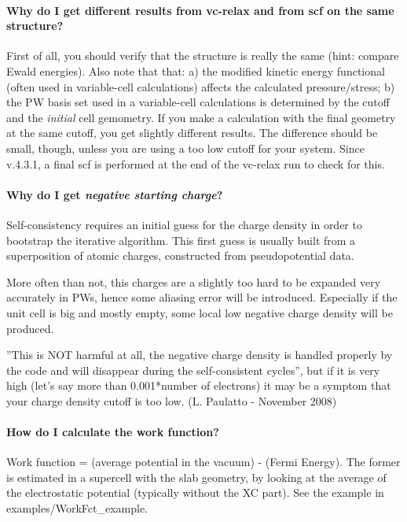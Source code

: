 \documentclass[12pt,a4paper]{article}
\begin{document}
\paragraph{Why do I get different results from vc-relax and from scf 
on the same structure?}
First of all, you should verify that the structure is really the same
(hint: compare Ewald energies). Also note that
that: a) the modified kinetic energy functional (often used in
variable-cell calculations) affects the calculated pressure/stress;
b) the PW basis set used in a variable-cell calculations is
determined by the cutoff and the {\em initial} cell gemometry. 
If you make a calculation with the final geometry at the same 
cutoff, you get slightly different results. The difference should
be small, though, unless you are using a too low cutoff for your
system. Since v.4.3.1, a final scf is performed at the end of the
vc-relax run to check for this.

\paragraph{Why do I get {\em negative starting charge}?}
Self-consistency requires an initial guess for the charge density in
order to bootstrap the iterative algorithm. This first guess is
usually built from a superposition of atomic charges, constructed from
pseudopotential data. 

More often than not, this charges are a slightly too hard to be
expanded very accurately in PWs, hence some aliasing error
will be introduced. Especially if the unit cell is big and mostly
empty, some local low negative charge density will be produced. 

''This is NOT harmful at all, the negative charge density is handled
properly by the code and will disappear during the self-consistent
cycles'', but if it is very high (let's say more than 0.001*number of
electrons) it may be a symptom that your charge density cutoff is too
low. (L. Paulatto - November 2008)

\paragraph{How do I calculate the work function?}

Work function = (average potential in the vacuum) - (Fermi
Energy). The former is estimated in a supercell with the slab
geometry, by looking at the average of the electrostatic potential
(typically without the XC part). See the example in
examples/WorkFct\_example. 
\end{document}
